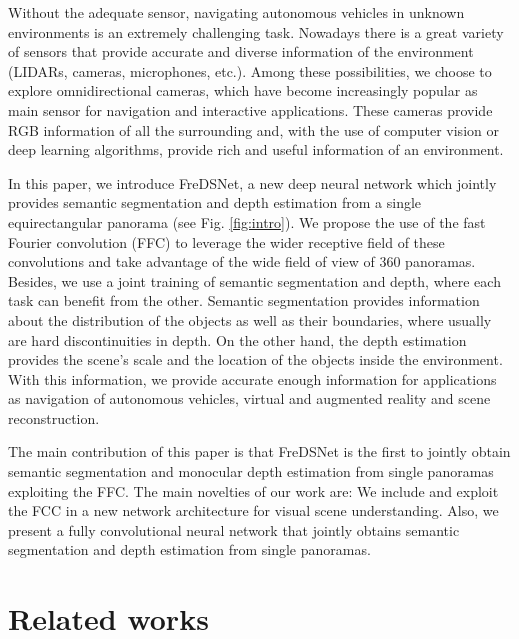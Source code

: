 \documentclass[letterpaper, 10 pt, conference]{ieeeconf}
\begin{document}
Without the adequate sensor, navigating autonomous vehicles in unknown environments is an extremely challenging task.
Nowadays there is a great variety of sensors that provide accurate and diverse information of the environment (LIDARs, cameras, microphones, etc.). Among these possibilities, we choose to explore omnidirectional cameras, which have become increasingly popular as main sensor for navigation and interactive applications. These cameras provide RGB information of all the surrounding and, with the use of computer vision or deep learning algorithms, provide rich and useful information of an environment. 

In this paper, we introduce FreDSNet, a new deep neural network which jointly provides semantic segmentation and depth estimation from a single equirectangular panorama (see Fig. \ref{fig:intro}). We propose the use of the fast Fourier convolution (FFC) \cite{chi2020fast} to leverage the wider receptive field of these convolutions and take advantage of the wide field of view of 360 panoramas. Besides, we use a joint training of semantic segmentation and depth, where each task can benefit from the other. Semantic segmentation provides information about the distribution of the objects as well as their boundaries, where usually are hard discontinuities in depth. On the other hand, the depth estimation provides the scene's scale and the location of the objects inside the environment. With this information, we provide accurate enough information for applications as navigation of autonomous vehicles, virtual and augmented reality and scene reconstruction.

The main contribution of this paper is that FreDSNet is the first to jointly obtain semantic segmentation and monocular depth estimation from single panoramas exploiting the FFC. 
The main novelties of our work are: We include and exploit the FCC in a new network architecture for visual scene understanding. Also, we present a fully convolutional neural network that jointly obtains semantic segmentation and depth estimation from single panoramas.



\section{Related works}
\label{sec:related}
\end{document}
